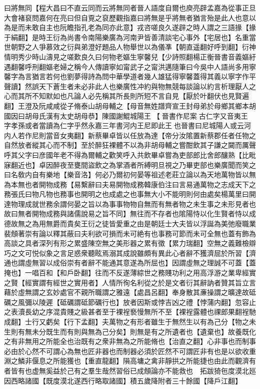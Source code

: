 曰將無同【程大昌曰不直云同而云將無同者晉人語度自爾也庾亮辟孟嘉為從事正旦大會褚裒問嘉何在亮曰但自覔之裒歷觀指嘉曰將無是乎將無者猶言殆是此人也意以為是而未敢自主也阮瞻指孔老為同亦此意】戎咨嗟良久遂辟之時人謂之三語掾【掾于絹翻】是時王衍為尚書令南陽樂廣為河南尹皆善清談宅心事外【宅居也】名重當世朝野之人爭慕效之衍與弟澄好題品人物舉世以為儀凖【朝直遥翻好呼到翻】衍神情明秀少時山濤見之嗟歎良久曰何物老嫗生寧馨兒【少詩照翻楊正衡晉書音義嫗紆遇翻馨呼刑翻嫗老婦之稱今人傳讀寧如甯武子之甯洪邁隨筆曰今吳中人語尚多用寧馨字為言猶言若何也劉夢得詩為問中華學道者幾人雄猛得寧馨蓋得其義以寧字作平聲讀】然誤天下蒼生者未必非此人也樂廣性冲約與物無競每談論以約言析理厭人之心而其所不知默如也凡論人必先稱其所長則所短不言自見【厭於叶翻伏也見賢遍翻】王澄及阮咸咸從子脩泰山胡母輔之【母音無姓譜齊宣王封母弟於母鄉其鄉本胡國因曰胡母氏漢有太史胡母恭】陳國謝鯤城陽王【晉書作尼案古仁字又音夷王字孝孫或者當讀為仁字乎然永嘉三年書河内王尼即此王也晉書曰尼城陽人或云河内人若作尼則當音女夷翻】新蔡畢卓皆以任放為達【帝分汝隂置新蔡郡任者任物之自然放者縱其心而不制】至於醉狂裸體不以為非胡母輔之嘗酣飲其子謙之闚而厲聲呼其父字曰彦國年老不得為爾輔之歡笑呼入共飲畢卓嘗為吏部郎比舍郎釀熟【比毗寐翻近也】卓因醉夜至甕間盜飲之為掌酒者所縛明旦視之乃畢吏部也樂廣聞而笑之曰名敎内自有樂地【樂音洛】何必乃爾初何晏等祖述老莊立論以為天地萬物皆以無為本無也者開物成務【易繫辭曰夫易開物成務韓康伯注曰言易通萬物之志成天下之務張氏曰物凡物也務事也開明之也成處之也事無大小不能明則何由處矣楊萬里曰開達物理成就世務余謂何晏之旨以為事事物物自無而有無者物之未生事之未形見者也故曰無者開物成務與諸儒說易之旨不同】無往而不存者也隂陽恃以化生賢者恃以成德故無之為用無爵而貴矣王衍之徒皆愛重之由是朝廷士大夫皆以浮誕為美弛廢職業裴頠著崇有論以釋其蔽曰夫利欲可損而未可絶有也事務可節而未可全無也蓋有飾為高談之具者深列有形之累盛陳空無之美形器之累有徵【累力瑞翻】空無之義難檢辯巧之文可悦似象之言足惑衆聽眩焉溺其成說雖頗有異此心者辭不獲濟屈於所習【濟通也謂虛無習以成俗崇有者辭不能通其意遂為所屈也】因謂虛無之理誠不可蓋【蓋掩也】一唱百和【和戶卧翻】往而不反遂薄綜世之務賤功利之用高浮游之業卑經實之賢【經實謂有經世之實用者】人情所徇名利從之於是文者衍其辭訥者贊其旨立言藉於虛無謂之玄妙處官不親所職謂之雅遠【處昌呂翻】奉身散其亷操謂之曠達故砥礪之風彌以陵遲【砥礪謂砥節礪行也】放者因斯或悖吉凶之禮【悖蒲内翻】忽容止之表瀆長幼之序混貴賤之級甚者至于裸裎䙝慢無所不至【裸裎露體也祼郎果翻裎馳成翻】士行又虧矣【行下孟翻】夫萬物之有形者雖生于無然生以有為己分【物之未生則有無未分既生而有則與無為己分矣】則無是有之所遺者也【遺棄也】故養既化之有非無用之所能全也治既有之衆非無為之所能脩也【治直之翻】心非事也而制事必由於心然不可謂心為無也匠非器也而制器必須於匠然不可謂匠非有也是以欲收重淵之鱗非偃息之所能獲也【重直龍翻】隕高墉之禽非靜拱之所能捷也由此而觀濟有者皆有也虚無奚益於己有之羣生哉然習俗已成頠論亦不能救也　拓跋猗㐌度漠北廵因西略諸國【既度漠北遂西行略取諸國】積五歲降附者三十餘國【降戶江翻】

